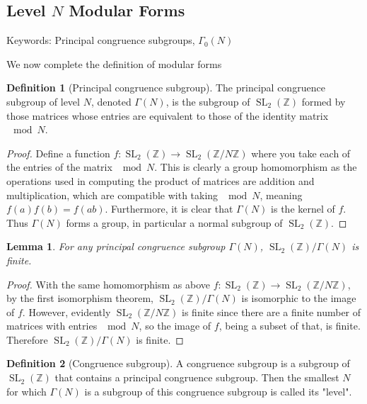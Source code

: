 \documentclass{article}
\newtheorem{lemma}[theorem]{Lemma}
\theoremstyle{definition}
\newtheorem{definition}{Definition}[section]
\theoremstyle{definition}
\theoremstyle{definition}
\newcommand{\SLZ}{\operatorname{SL}_2(\mathbb{Z})}
\begin{document}
\subsection{Level $N$ Modular Forms}
Keywords: Principal congruence subgroups, $\Gamma_0(N)$

We now complete the definition of modular forms
\begin{definition} [Principal congruence subgroup]
    The principal congruence subgroup of level $N$, denoted $\Gamma(N)$, is the subgroup of $\SLZ$ formed by those matrices whose entries are equivalent to those of the identity matrix $\mod N$.
\end{definition}

\begin{proof}
    Define a function $f:\SLZ\rightarrow \operatorname{SL}_2(\mathbb{Z}/N\mathbb Z)$ where you take each of the entries of the matrix $\mod N$. This is clearly a group homomorphism as the operations used in computing the product of matrices are addition and multiplication, which are compatible with taking $\mod N$, meaning $f(a)f(b)=f(ab)$. Furthermore, it is clear that $\Gamma(N)$ is the kernel of $f$. Thus $\Gamma(N)$ forms a group, in particular a normal subgroup of $\SLZ$.
\end{proof}

\begin{lemma}
    For any principal congruence subgroup $\Gamma(N)$, $\SLZ/\Gamma(N)$ is finite.
\end{lemma}
\begin{proof}
    With the same homomorphism as above $f:\SLZ\rightarrow \operatorname{SL}_2(\mathbb{Z}/N\mathbb Z)$, by the first isomorphism theorem, $\SLZ/\Gamma(N)$ is isomorphic to the image of $f$. However, evidently $\operatorname{SL}_2(\mathbb{Z}/N\mathbb Z)$ is finite since there are a finite number of matrices with entries $\mod N$, so the image of $f$, being a subset of that, is finite. Therefore $\SLZ/\Gamma(N)$ is finite.
\end{proof}

\begin{definition} [Congruence subgroup]
    A congruence subgroup is a subgroup of $\SLZ$ that contains a principal congruence subgroup. Then the smallest $N$ for which $\Gamma(N)$ is a subgroup of this congruence subgroup is called its "level".
\end{definition}
\end{document}
